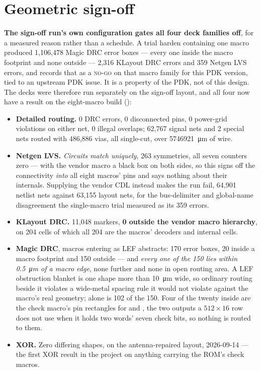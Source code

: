 \section{Geometric sign-off}
\label{sec:phys-decks}

\textbf{The sign-off run's own configuration gates all four deck
families off}, for a measured reason rather than a schedule. A trial
harden containing one  macro produced 1,106,478 Magic
DRC error boxes --- every one inside the macro footprint and none
outside --- 2,316 KLayout DRC errors and 359 Netgen LVS errors, and
 records that as a \textsc{no-go} on that macro
family for this PDK version, tied to an upstream PDK issue. It is a
property of the PDK, not of this design. The decks were therefore run
separately on the sign-off layout, and all four now have a result on the
eight-macro build ():

\begin{itemize}
\item \textbf{Detailed routing.} 0 DRC errors, 0 disconnected pins, 0
  power-grid violations on either net, 0 illegal overlaps; 62,767 signal
  nets and 2 special nets routed with 486,886 vias, all single-cut, over
  \qty{5746921}{\um} of wire.
\item \textbf{Netgen LVS.} \emph{Circuits match uniquely}, 263
  symmetries, all seven counters zero --- with the vendor macro a black
  box on both sides, so this signs off the connectivity \emph{into} all
  eight macros' pins and says nothing about their internals. Supplying
  the vendor CDL instead makes the run fail, 64,901 netlist nets against
  63,155 layout nets, for the bus-delimiter and global-name
  disagreement the single-macro trial measured as its 359 errors.
\item \textbf{KLayout DRC.} 11,048 markers, \textbf{0 outside the vendor
  macro hierarchy}, on 204 cells of which all 204 are the macros'
  decoders and internal cells.
\item \textbf{Magic DRC}, macros entering as LEF abstracts: 170 error
  boxes, 20 inside a macro footprint and 150 outside --- and
  \emph{every one of the 150 lies within \qty{0.5}{\um} of a
  macro edge}, none further and none in open routing area. A LEF
  obstruction blanket is one shape more than \qty{10}{\um}
  wide, so ordinary routing beside it violates a wide-metal spacing rule
  it would not violate against the macro's real geometry; 
  alone is 102 of the 150. Four of the twenty inside are the check
  macro's pin rectangles for  and ,
  the two outputs a $512\times16$ row does not use when it holds two
  words' seven check bits, so nothing is routed to them.
\item \textbf{XOR.} Zero differing shapes, on the antenna-repaired
  layout, 2026-09-14 --- the first XOR result in the project on anything
  carrying the ROM's check macros.
\end{itemize}

